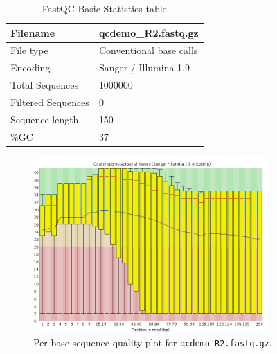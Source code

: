 \begin{table}[H]
  \centering
  \caption{FastQC Basic Statistics table}
    \begin{tabular}{ll}
    \toprule
    Filename & qcdemo\_R2.fastq.gz \\
    \midrule
    File type & Conventional base calls \\
    Encoding & Sanger / Illumina 1.9 \\
    Total Sequences & 1000000 \\
    Filtered Sequences & 0 \\
    Sequence length & 150 \\
    \%GC  & 37 \\
    \bottomrule
    \end{tabular}
  \label{tab:badexampleuntrimmed}
\end{table}

\begin{figure}[H]
\centering
\includegraphics[width=0.8\textwidth]{handout/bad_qcdemo_R2.png}
\caption{Per base sequence quality plot for \texttt{qcdemo\_R2.fastq.gz}.}
\label{fig:bad_example_untrimmed_plot}
\end{figure}

